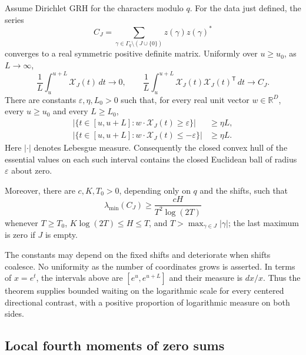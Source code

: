 \begin{theorem}
\label{thm:pf-main}
Assume Dirichlet GRH for the characters modulo $q$.  For the data just
defined, the series
\begin{equation}
\label{eq:pf-cov}
 C_J=\sum_{\gamma\in\Gamma_q\setminus(J\cup\{0\})}
                   z(\gamma)z(\gamma)^*
\end{equation}
converges to a real symmetric positive definite matrix.  Uniformly over
$u\geq u_0$, as $L\longrightarrow\infty$,
\begin{equation}
\label{eq:pf-moments}
 \frac1L\int_u^{u+L}\mathcal X_J(t)\,dt\longrightarrow0,
 \qquad
 \frac1L\int_u^{u+L}\mathcal X_J(t)\mathcal X_J(t)^{\mathsf T}\,dt
                       \longrightarrow C_J.
\end{equation}
There are constants $\varepsilon,\eta,L_0>0$ such that, for every real unit
vector $w\in\mathbb R^D$, every $u\geq u_0$ and every $L\geq L_0$,
\begin{align}
\label{eq:pf-positive}
 \bigl|\{t\in[u,u+L]:w\cdot\mathcal X_J(t)\geq\varepsilon\}\bigr|
       &\geq\eta L,\\
\label{eq:pf-negative}
 \bigl|\{t\in[u,u+L]:w\cdot\mathcal X_J(t)\leq-\varepsilon\}\bigr|
       &\geq\eta L.
\end{align}
Here $|\cdot|$ denotes Lebesgue measure.  Consequently the closed convex
hull of the essential values on each such interval contains the closed
Euclidean ball of radius $\varepsilon$ about zero.

Moreover, there are $c,K,T_0>0$, depending only on $q$ and the shifts,
such that
\begin{equation}
\label{eq:pf-band}
 \lambda_{\min}(C_J)\geq\frac{cH}{T^2\log(2T)}
\end{equation}
whenever $T\geq T_0$, $K\log(2T)\leq H\leq T$, and
$T>\max_{\gamma\in J}|\gamma|$; the last maximum is zero if $J$ is empty.
\end{theorem}

The constants may depend on the fixed shifts and deteriorate when shifts
coalesce.  No uniformity as the number of coordinates grows is asserted.
In terms of $x=e^t$, the intervals above are $[e^u,e^{u+L}]$ and their
measure is $dx/x$.  Thus the theorem supplies bounded waiting on the
logarithmic scale for every centered directional contrast, with a positive
proportion of logarithmic measure on both sides.

\subsection{Local fourth moments of zero sums}
\label{subsec:pf-local}

